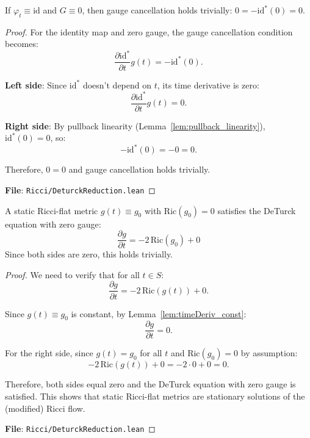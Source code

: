 \begin{lemma}
\label{lem:gaugeCancellationOn_id_zero}
\leanok
{}
If $\varphi_t \equiv \mathrm{id}$ and $G \equiv 0$, then gauge cancellation holds trivially: $0 = -\mathrm{id}^*(0) = 0$.
\end{lemma}

\begin{proof}
\leanok
{}
For the identity map and zero gauge, the gauge cancellation condition becomes:
\[
\frac{\partial \mathrm{id}^*}{\partial t} g(t) = -\mathrm{id}^*(0).
\]

\textbf{Left side}: Since $\mathrm{id}^*$ doesn't depend on $t$, its time derivative is zero:
\[
\frac{\partial \mathrm{id}^*}{\partial t} g(t) = 0.
\]

\textbf{Right side}: By pullback linearity (Lemma~\ref{lem:pullback_linearity}), $\mathrm{id}^*(0) = 0$, so:
\[
-\mathrm{id}^*(0) = -0 = 0.
\]

Therefore, $0 = 0$ and gauge cancellation holds trivially.

\textbf{File}: \texttt{Ricci/DeturckReduction.lean}
\end{proof}

\begin{lemma}
\label{lem:deturckEqOnWithGauge_ricciFlat_static}
\leanok
{}
A static Ricci-flat metric $g(t) \equiv g_0$ with $\mathrm{Ric}(g_0) = 0$ satisfies the DeTurck equation with zero gauge:
\[ \frac{\partial g}{\partial t} = -2\,\mathrm{Ric}(g_0) + 0 \]
Since both sides are zero, this holds trivially.
\end{lemma}

\begin{proof}
\leanok
{}
We need to verify that for all $t \in S$:
\[
\frac{\partial g}{\partial t} = -2\,\mathrm{Ric}(g(t)) + 0.
\]

Since $g(t) \equiv g_0$ is constant, by Lemma~\ref{lem:timeDeriv_const}:
\[
\frac{\partial g}{\partial t} = 0.
\]

For the right side, since $g(t) = g_0$ for all $t$ and $\mathrm{Ric}(g_0) = 0$ by assumption:
\[
-2\,\mathrm{Ric}(g(t)) + 0 = -2 \cdot 0 + 0 = 0.
\]

Therefore, both sides equal zero and the DeTurck equation with zero gauge is satisfied. This shows that static Ricci-flat metrics are stationary solutions of the (modified) Ricci flow.

\textbf{File}: \texttt{Ricci/DeturckReduction.lean}
\end{proof}

